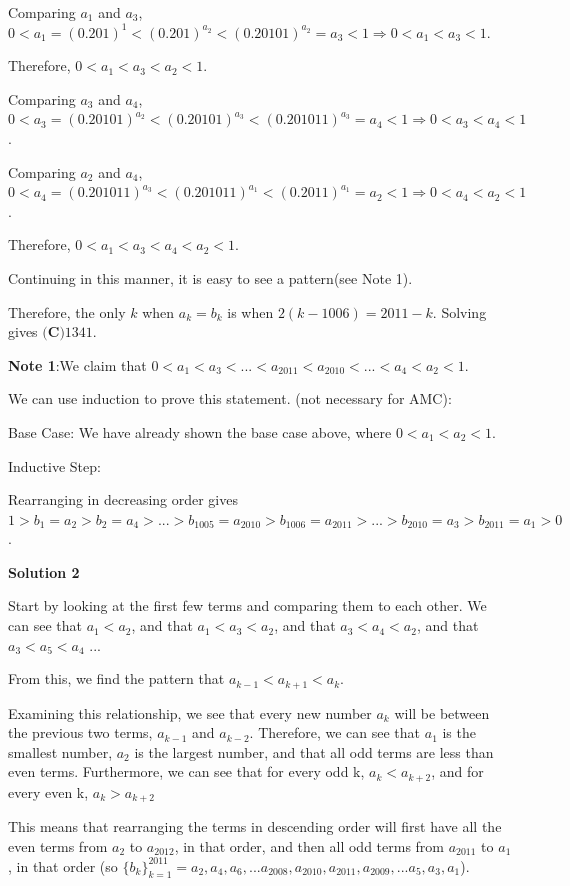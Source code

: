 \begin{enumerate}
 Comparing $a_1$ and $a_3$, $0 < a_1 = (0.201)^1 < (0.201)^{a_2} < (0.20101)^{a_2} = a_3 < 1 \Rightarrow 0 < a_1 < a_3 < 1$.

 Therefore, $0 < a_1 < a_3 < a_2 < 1$.

 Comparing $a_3$ and $a_4$, $0 < a_3 = (0.20101)^{a_2} < (0.20101)^{a_3} < (0.201011)^{a_3} = a_4 < 1 \Rightarrow 0 < a_3 < a_4 < 1$.

 Comparing $a_2$ and $a_4$, $0 < a_4 = (0.201011)^{a_3} < (0.201011)^{a_1} < (0.2011)^{a_1} = a_2 < 1 \Rightarrow 0 < a_4 < a_2 < 1$.

 Therefore, $0 < a_1 < a_3 < a_4 < a_2 < 1$.

 Continuing in this manner, it is easy to see a pattern(see Note 1).

 Therefore, the only $k$ when $a_k = b_k$ is when $2(k-1006) = 2011 - k$. Solving gives $\boxed{\textbf{(C)} 1341}$.

 
\textbf{Note 1}:We claim that $0 < a_1 < a_3 < ... < a_{2011} < a_{2010} < ... < a_4 < a_2 < 1$.

 We can use induction to prove this statement. (not necessary for AMC):

 Base Case: We have already shown the base case above, where $0 < a_1 < a_2 < 1$.

 Inductive Step: 

 Rearranging in decreasing order gives $1 > b_1 = a_2 > b_2 = a_4 > ... > b_{1005} = a_{2010} > b_{1006} = a_{2011} > ... > b_{2010} = a_3 > b_{2011} =  a_1 > 0$.

 



\textbf{Solution 2}

Start by looking at the first few terms and comparing them to each other. We can see that $a_1 < a_2$, and that $a_1 < a_3 < a_2$, and that $a_3 < a_4 < a_2$, and that $a_3 < a_5 < a_4$ ... 

 From this, we find the pattern that $a_{k-1} < a_{k+1} < a_k$.

 Examining this relationship, we see that every new number $a_k$ will be between the previous two terms, $a_{k-1}$ and $a_{k-2}$. Therefore, we can see that $a_1$ is the smallest number, $a_2$ is the largest number, and that all odd terms are less than even terms. Furthermore, we can see that for every odd k, $a_k < a_{k+2}$, and for every even k, $a_k > a_{k+2}$

 This means that rearranging the terms in descending order will first have all the even terms from $a_2$ to $a_{2012}$, in that order, and then all odd terms from $a_{2011}$ to $a_1$, in that order (so $\{b_k\}_{k=1}^{2011} = {a_2, a_4, a_6, ... a_{2008}, a_{2010}, a_{2011}, a_{2009}, ... a_5, a_3, a_1}$).


\end{enumerate}
